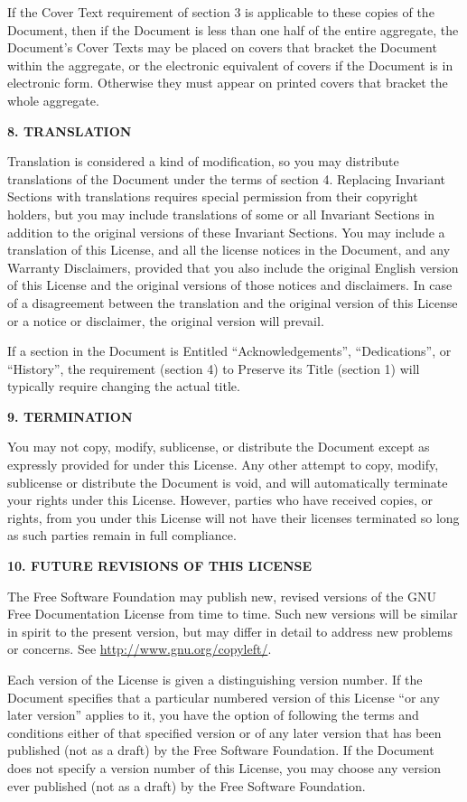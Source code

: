 \documentclass[a4paper,12pt,english]{sphinxmanual}
\begin{document}
If the Cover Text requirement of section 3 is applicable to these copies
of the Document, then if the Document is less than one half of the
entire aggregate, the Document’s Cover Texts may be placed on covers
that bracket the Document within the aggregate, or the electronic
equivalent of covers if the Document is in electronic form. Otherwise
they must appear on printed covers that bracket the whole aggregate.

\textbf{8. TRANSLATION}

Translation is considered a kind of modification, so you may distribute
translations of the Document under the terms of section 4. Replacing
Invariant Sections with translations requires special permission from
their copyright holders, but you may include translations of some or all
Invariant Sections in addition to the original versions of these
Invariant Sections. You may include a translation of this License, and
all the license notices in the Document, and any Warranty Disclaimers,
provided that you also include the original English version of this
License and the original versions of those notices and disclaimers. In
case of a disagreement between the translation and the original version
of this License or a notice or disclaimer, the original version will
prevail.

If a section in the Document is Entitled ``Acknowledgements'',
``Dedications'', or ``History'', the requirement (section 4) to Preserve its
Title (section 1) will typically require changing the actual title.

\textbf{9. TERMINATION}

You may not copy, modify, sublicense, or distribute the Document except
as expressly provided for under this License. Any other attempt to copy,
modify, sublicense or distribute the Document is void, and will
automatically terminate your rights under this License. However, parties
who have received copies, or rights, from you under this License will
not have their licenses terminated so long as such parties remain in
full compliance.

\textbf{10. FUTURE REVISIONS OF THIS LICENSE}

The Free Software Foundation may publish new, revised versions of the
GNU Free Documentation License from time to time. Such new versions will
be similar in spirit to the present version, but may differ in detail to
address new problems or concerns. See \href{http://www.gnu.org/copyleft/}{http://www.gnu.org/copyleft/}.

Each version of the License is given a distinguishing version number. If
the Document specifies that a particular numbered version of this
License ``or any later version'' applies to it, you have the option of
following the terms and conditions either of that specified version or
of any later version that has been published (not as a draft) by the
Free Software Foundation. If the Document does not specify a version
number of this License, you may choose any version ever published (not
as a draft) by the Free Software Foundation.
\end{document}
